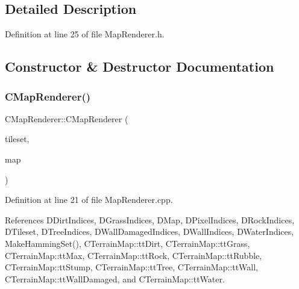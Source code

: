 \subsection{Detailed Description}


Definition at line 25 of file Map\+Renderer.\+h.



\subsection{Constructor \& Destructor Documentation}
\hypertarget{classCMapRenderer_a9aca3f780976a94fc6e8873e3cf8e199}{}\label{classCMapRenderer_a9aca3f780976a94fc6e8873e3cf8e199} 
\subsubsection{\texorpdfstring{C\+Map\+Renderer()}{CMapRenderer()}}
{\footnotesize\ttfamily C\+Map\+Renderer\+::\+C\+Map\+Renderer (\begin{DoxyParamCaption}\item[{std\+::shared\+\_\+ptr$<$ \hyperlink{classCGraphicTileset}{C\+Graphic\+Tileset} $>$}]{tileset,  }\item[{std\+::shared\+\_\+ptr$<$ \hyperlink{classCTerrainMap}{C\+Terrain\+Map} $>$}]{map }\end{DoxyParamCaption})}



Definition at line 21 of file Map\+Renderer.\+cpp.



References D\+Dirt\+Indices, D\+Grass\+Indices, D\+Map, D\+Pixel\+Indices, D\+Rock\+Indices, D\+Tileset, D\+Tree\+Indices, D\+Wall\+Damaged\+Indices, D\+Wall\+Indices, D\+Water\+Indices, Make\+Hamming\+Set(), C\+Terrain\+Map\+::tt\+Dirt, C\+Terrain\+Map\+::tt\+Grass, C\+Terrain\+Map\+::tt\+Max, C\+Terrain\+Map\+::tt\+Rock, C\+Terrain\+Map\+::tt\+Rubble, C\+Terrain\+Map\+::tt\+Stump, C\+Terrain\+Map\+::tt\+Tree, C\+Terrain\+Map\+::tt\+Wall, C\+Terrain\+Map\+::tt\+Wall\+Damaged, and C\+Terrain\+Map\+::tt\+Water.


